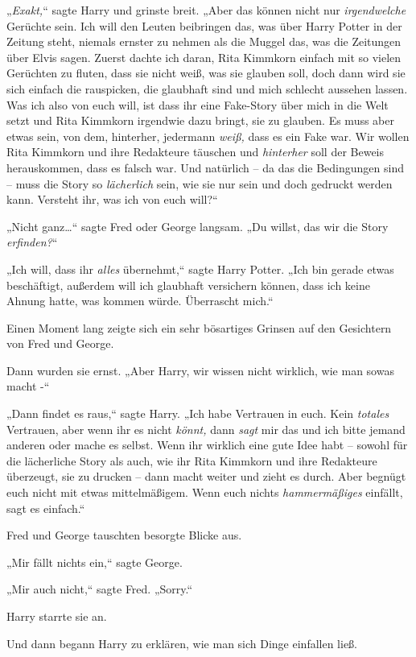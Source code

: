 {„\emph{Exakt,}“ sagte Harry und grinste breit. „Aber das können nicht nur \emph{irgendwelche} Gerüchte sein. Ich will den Leuten beibringen das, was über Harry Potter in der Zeitung steht, niemals ernster zu nehmen als die Muggel das, was die Zeitungen über Elvis sagen. Zuerst dachte ich daran, Rita Kimmkorn einfach mit so vielen Gerüchten zu fluten, dass sie nicht weiß, was sie glauben soll, doch dann wird sie sich einfach die rauspicken, die glaubhaft sind und mich schlecht aussehen lassen. Was ich also von euch will, ist dass ihr eine Fake-Story über mich in die Welt setzt und Rita Kimmkorn irgendwie dazu bringt, sie zu glauben. Es muss aber etwas sein, von dem, hinterher, jedermann \emph{weiß,} dass es ein Fake war. Wir wollen Rita Kimmkorn und ihre Redakteure täuschen und \emph{hinterher} soll der Beweis herauskommen, dass es falsch war. Und natürlich -- da das die Bedingungen sind -- muss die Story so \emph{lächerlich} sein, wie sie nur sein und doch gedruckt werden kann. Versteht ihr, was ich von euch will?“

„Nicht ganz…“ sagte Fred oder George langsam. „Du willst, das wir die Story \emph{erfinden?}“

„Ich will, dass ihr \emph{alles} übernehmt,“ sagte Harry Potter. „Ich bin gerade etwas beschäftigt, außerdem will ich glaubhaft versichern können, dass ich keine Ahnung hatte, was kommen würde. Überrascht mich.“

Einen Moment lang zeigte sich ein sehr bösartiges Grinsen auf den Gesichtern von Fred und George.

Dann wurden sie ernst. „Aber Harry, wir wissen nicht wirklich, wie man sowas macht -“

„Dann findet es raus,“ sagte Harry. „Ich habe Vertrauen in euch. Kein \emph{totales} Vertrauen, aber wenn ihr es nicht \emph{könnt,} dann \emph{sagt} mir das und ich bitte jemand anderen oder mache es selbst. Wenn ihr wirklich eine gute Idee habt -- sowohl für die lächerliche Story als auch, wie ihr Rita Kimmkorn und ihre Redakteure überzeugt, sie zu drucken -- dann macht weiter und zieht es durch. Aber begnügt euch nicht mit etwas mittelmäßigem. Wenn euch nichts \emph{hammermäßiges} einfällt, sagt es einfach.“

Fred und George tauschten besorgte Blicke aus.

„Mir fällt nichts ein,“ sagte George.

„Mir auch nicht,“ sagte Fred. „Sorry.“

Harry starrte sie an.

Und dann begann Harry zu erklären, wie man sich Dinge einfallen ließ.

}
